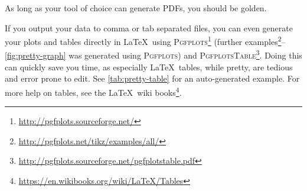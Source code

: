 As long as your tool of choice can generate PDFs, you should be golden.

If you output your data to comma or tab separated files, you can even
generate your plots and tables directly in \LaTeX\ using
\textsc{Pgfplots}\footnote{\url{http://pgfplots.sourceforge.net/}}
   (further
   examples\footnote{\url{http://pgfplots.net/tikz/examples/all/}}--\autoref{fig:pretty-graph}
   was generated using \textsc{Pgfplots}) and
\textsc{PgfplotsTable}\footnote{\url{http://pgfplots.sourceforge.net/pgfplotstable.pdf}}.
Doing this can quickly save you time, as especially \LaTeX\ tables, while
pretty, are tedious and error prone to edit. See
\autoref{tab:pretty-table} for an auto-generated example. For more help on
tables, see the \LaTeX\ wiki books\footnote{\url{https://en.wikibooks.org/wiki/LaTeX/Tables}}.


